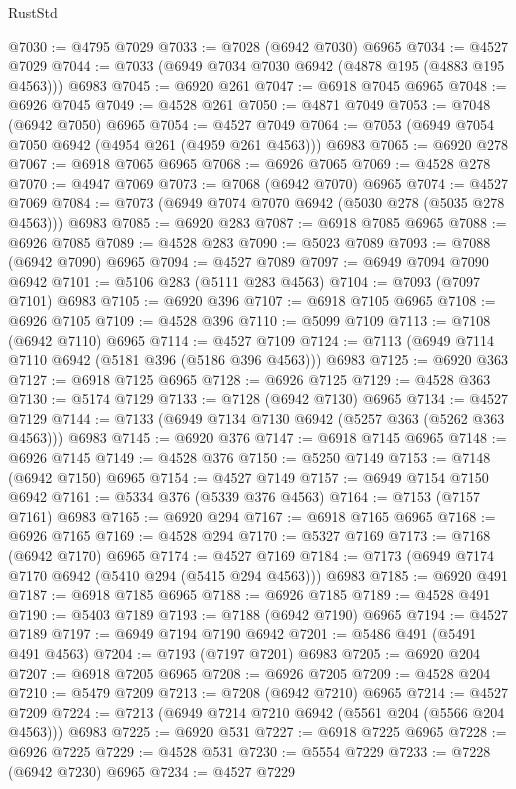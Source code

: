 \begin{lexlean}{RustStd}
\begin{coremodule}
@7030 := @4795 @7029
@7033 := @7028 (@6942 @7030) @6965
@7034 := @4527 @7029
@7044 := @7033 (@6949 @7034 @7030 @6942 (@4878 @195 (@4883 @195 @4563))) @6983
@7045 := @6920 @261
@7047 := @6918 @7045 @6965
@7048 := @6926 @7045
@7049 := @4528 @261
@7050 := @4871 @7049
@7053 := @7048 (@6942 @7050) @6965
@7054 := @4527 @7049
@7064 := @7053 (@6949 @7054 @7050 @6942 (@4954 @261 (@4959 @261 @4563))) @6983
@7065 := @6920 @278
@7067 := @6918 @7065 @6965
@7068 := @6926 @7065
@7069 := @4528 @278
@7070 := @4947 @7069
@7073 := @7068 (@6942 @7070) @6965
@7074 := @4527 @7069
@7084 := @7073 (@6949 @7074 @7070 @6942 (@5030 @278 (@5035 @278 @4563))) @6983
@7085 := @6920 @283
@7087 := @6918 @7085 @6965
@7088 := @6926 @7085
@7089 := @4528 @283
@7090 := @5023 @7089
@7093 := @7088 (@6942 @7090) @6965
@7094 := @4527 @7089
@7097 := @6949 @7094 @7090 @6942
@7101 := @5106 @283 (@5111 @283 @4563)
@7104 := @7093 (@7097 @7101) @6983
@7105 := @6920 @396
@7107 := @6918 @7105 @6965
@7108 := @6926 @7105
@7109 := @4528 @396
@7110 := @5099 @7109
@7113 := @7108 (@6942 @7110) @6965
@7114 := @4527 @7109
@7124 := @7113 (@6949 @7114 @7110 @6942 (@5181 @396 (@5186 @396 @4563))) @6983
@7125 := @6920 @363
@7127 := @6918 @7125 @6965
@7128 := @6926 @7125
@7129 := @4528 @363
@7130 := @5174 @7129
@7133 := @7128 (@6942 @7130) @6965
@7134 := @4527 @7129
@7144 := @7133 (@6949 @7134 @7130 @6942 (@5257 @363 (@5262 @363 @4563))) @6983
@7145 := @6920 @376
@7147 := @6918 @7145 @6965
@7148 := @6926 @7145
@7149 := @4528 @376
@7150 := @5250 @7149
@7153 := @7148 (@6942 @7150) @6965
@7154 := @4527 @7149
@7157 := @6949 @7154 @7150 @6942
@7161 := @5334 @376 (@5339 @376 @4563)
@7164 := @7153 (@7157 @7161) @6983
@7165 := @6920 @294
@7167 := @6918 @7165 @6965
@7168 := @6926 @7165
@7169 := @4528 @294
@7170 := @5327 @7169
@7173 := @7168 (@6942 @7170) @6965
@7174 := @4527 @7169
@7184 := @7173 (@6949 @7174 @7170 @6942 (@5410 @294 (@5415 @294 @4563))) @6983
@7185 := @6920 @491
@7187 := @6918 @7185 @6965
@7188 := @6926 @7185
@7189 := @4528 @491
@7190 := @5403 @7189
@7193 := @7188 (@6942 @7190) @6965
@7194 := @4527 @7189
@7197 := @6949 @7194 @7190 @6942
@7201 := @5486 @491 (@5491 @491 @4563)
@7204 := @7193 (@7197 @7201) @6983
@7205 := @6920 @204
@7207 := @6918 @7205 @6965
@7208 := @6926 @7205
@7209 := @4528 @204
@7210 := @5479 @7209
@7213 := @7208 (@6942 @7210) @6965
@7214 := @4527 @7209
@7224 := @7213 (@6949 @7214 @7210 @6942 (@5561 @204 (@5566 @204 @4563))) @6983
@7225 := @6920 @531
@7227 := @6918 @7225 @6965
@7228 := @6926 @7225
@7229 := @4528 @531
@7230 := @5554 @7229
@7233 := @7228 (@6942 @7230) @6965
@7234 := @4527 @7229

\end{coremodule}
\end{lexlean}
